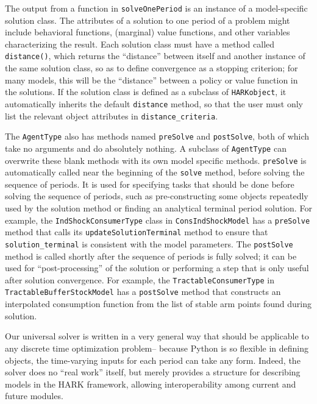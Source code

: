 \documentclass[12pt,titlepage,letterpaper]{econtex}
\begin{document}
The output from a function in \texttt{solveOnePeriod} is an instance of a model-specific solution class.  The attributes of a solution to one period of a problem might include behavioral functions, (marginal) value functions, and other variables characterizing the result.  Each solution class must have a method called \texttt{distance()}, which returns the ``distance'' between itself and another instance of the same solution class, so as to define convergence as a stopping criterion; for many models, this will be the ``distance'' between a policy or value function in the solutions.  If the solution class is defined as a subclass of \texttt{HARKobject}, it automatically inherits the default \texttt{distance} method, so that the user must only list the relevant object attributes in \texttt{distance\_criteria}.

The \texttt{AgentType} also has methods named \texttt{preSolve} and \texttt{postSolve}, both of which take no arguments and do absolutely nothing.  A subclass of \texttt{AgentType} can overwrite these blank methods with its own model specific methods.  \texttt{preSolve} is automatically called near the beginning of the \texttt{solve} method, before solving the sequence of periods.  It is used for specifying tasks that should be done before solving the sequence of periods, such as pre-constructing some objects repeatedly used by the solution method or finding an analytical terminal period solution.  For example, the \texttt{IndShockConsumerType} class in \texttt{ConsIndShockModel} has a \texttt{preSolve} method that calls its \texttt{updateSolutionTerminal} method to ensure that \texttt{solution\_terminal} is consistent with the model parameters.  The \texttt{postSolve} method is called shortly after the sequence of periods is fully solved; it can be used for ``post-processing'' of the solution or performing a step that is only useful after solution convergence.  For example, the \texttt{TractableConsumerType} in \texttt{TractableBufferStockModel} has a \texttt{postSolve} method that constructs an interpolated consumption function from the list of stable arm points found during solution.

Our universal solver is written in a very general way that should be applicable to any discrete time optimization problem-- because Python is so flexible in defining objects, the time-varying inputs for each period can take any form.  Indeed, the solver does no ``real work'' itself, but merely provides a structure for describing models in the HARK framework, allowing interoperability among current and future modules. 
\end{document}
